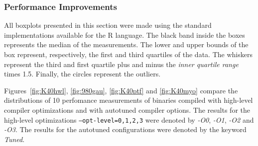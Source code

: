 \subsubsection{Performance Improvements}

All boxplots presented in this section were made using the standard
implementations available for the R language.  The black band inside the boxes
represents the median of the measurements. The lower and upper bounds of the
box represent, respectively, the first and third quartiles of the data. The
whiskers represent the third and first quartile plus and minus the \emph{inner
quartile range} times 1.5. Finally, the circles represent the outliers.

Figures~\ref{fig:K40hwl}, \ref{fig:980gau}, \ref{fig:K40ptf} and
\ref{fig:K40myo} compare the distributions of 10 perfomance measurements of
binaries compiled with high-level compiler optimizations and with autotuned
compiler options. The results for the high-level optimizations
\texttt{--opt-level=0,1,2,3} were denoted by \emph{-O0}, \emph{-O1}, \emph{-O2}
and \emph{-O3}.  The results for the autotuned configurations were denoted by
the keyword \emph{Tuned}.

